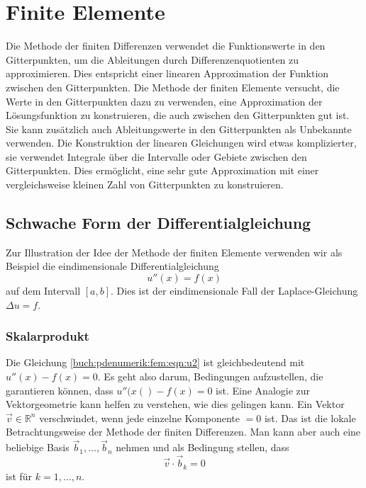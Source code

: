 %
%
\section{Finite Elemente
\label{buch:pdenumerik:section:fem}}
%
Die Methode der finiten Differenzen verwendet die Funktionswerte
in den Gitterpunkten, um die Ableitungen durch Differenzenquotienten
zu approximieren.
Dies entspricht einer linearen Approximation der Funktion zwischen
den Gitterpunkten.
Die Methode der finiten Elemente versucht, die Werte in den
Gitterpunkten dazu zu verwenden, eine Approximation der Lösungsfunktion
zu konstruieren, die auch zwischen den Gitterpunkten gut ist.
Sie kann zusätzlich auch Ableitungswerte in den Gitterpunkten als
Unbekannte verwenden.
Die Konstruktion der linearen Gleichungen wird etwas komplizierter,
sie verwendet Integrale über die Intervalle oder Gebiete zwischen
den Gitterpunkten.
Dies ermöglicht, eine sehr gute Approximation mit einer vergleichsweise
kleinen Zahl von Gitterpunkten zu konstruieren.

%
%
\subsection{Schwache Form der Differentialgleichung}
Zur Illustration der Idee der Methode der finiten Elemente verwenden wir
als Beispiel die eindimensionale Differentialgleichung
\begin{equation}
u''(x) = f(x)
\label{buch:pdenumerik:fem:eqn:u2}
\end{equation}
auf dem Intervall $[a,b]$.
Dies ist der eindimensionale Fall der Laplace-Gleichung $\Delta u = f$.

%
%
\subsubsection{Skalarprodukt}
Die Gleichung \eqref{buch:pdenumerik:fem:eqn:u2} ist gleichbedeutend
mit $u''(x)-f(x)=0$.
Es geht also darum, Bedingungen aufzustellen, die garantieren können,
dass $u''(x()-f(x)=0$ ist.
Eine Analogie zur Vektorgeometrie kann helfen zu verstehen, wie dies 
gelingen kann.
Ein Vektor $\vec{v}\in\mathbb{R}^n$ verschwindet, wenn jede einzelne
Komponente $=0$ ist.
Das ist die lokale Betrachtungsweise der Methode der finiten Differenzen.
Man kann aber auch eine beliebige Basis $\vec{b}_1,\dots,\vec{b}_n$ nehmen
und als Bedingung stellen, dass 
\[
\vec{v}\cdot\vec{b}_k = 0
\]
ist für $k=1,\dots,n$.

